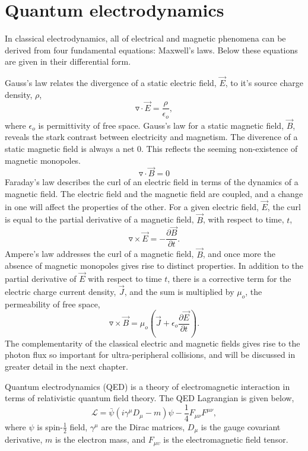 \section{Quantum electrodynamics}

In classical electrodynamics, all of electrical and magnetic phenomena can be derived from four fundamental equations: Maxwell's laws. Below these equations are given in their differential form. 

Gauss's law relates the divergence of a static electric field, $\vec{E}$, to it's source charge density, $\rho$,
\begin{equation}
\triangledown\cdot\vec{E}= \frac{\rho}{\epsilon_o},
\end{equation}
where $\epsilon_o$ is permittivity of free space. Gauss's law for a static magnetic field, $\vec{B}$, reveals the stark contrast between electricity and magnetism. The diverence of a static magnetic field is always a net 0. This reflects the seeming non-existence of magnetic monopoles.  
\begin{equation}
\triangledown\cdot\vec{B}=0
\end{equation}
Faraday's law describes the curl of an electric field in terms of the dynamics of a magnetic field. The electric field and the magnetic field are coupled, and a change in one will affect the properties of the other. For a given electric field, $\vec{E}$, the curl is equal to the partial derivative of a magnetic field, $\vec{B}$, with respect to time, $t$,
\begin{equation}
\triangledown\times\vec{E}=-\frac{\partial\vec{B}}{\partial t}.
\end{equation}
Ampere's law addresses the curl of a magnetic field, $\vec{B}$, and once more the absence of magnetic monopoles gives rise to distinct properties. In addition to the partial derivative of $\vec{E}$ with respect to time $t$, there is a corrective term for the electric charge current density, $\vec{J}$, and the sum is multiplied by $\mu_o$, the permeability of free space,
\begin{equation}
\triangledown \times \vec{B} = \mu_o \left(  \vec{J} + \epsilon _{o} \frac{\partial \vec{E}}{\partial t} \right ).
\end{equation}
The complementarity of the classical electric and magnetic fields gives rise to the photon flux so important for ultra-peripheral collisions, and will be discussed in greater detail in the next chapter.

Quantum electrodynamics (QED) is a theory of electromagnetic interaction in terms of relativistic quantum field theory. The QED Lagrangian is given below,
\begin{equation}
{\mathcal {L}}={\bar {\psi }}(i\gamma ^{\mu }D_{\mu }-m)\psi -{\frac {1}{4}}F_{\mu \nu }F^{\mu \nu },
\end{equation} 
where $\psi$ is spin-$\frac{1}{2}$ field, $\gamma^\mu$ are the Dirac matrices, $D_\mu$ is the gauge covariant derivative, $m$ is the electron mass, and $F_{\mu\upsilon}$ is the electromagnetic field tensor.

